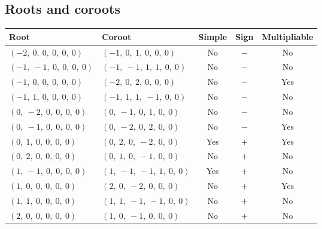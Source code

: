 \documentclass[11pt]{article}
\theoremstyle{definition}
\begin{document}
\subsection{Roots and coroots}
\begin{center}
\begin{tabular}{|l|l|c|c|c|}
    \hline
    \textbf{Root} & \textbf{Coroot} & \textbf{Simple} & \textbf{Sign} & \textbf{Multipliable} \\
    \hline
    $\left( -2, \  0, \  0, \  0, \  0, \  0\right)$ & $\left( -1, \  0, \  1, \  0, \  0, \  0\right)$ & No & $-$ & No \\
    \hline
    $\left( -1, \  -1, \  0, \  0, \  0, \  0\right)$ & $\left( -1, \  -1, \  1, \  1, \  0, \  0\right)$ & No & $-$ & No \\
    \hline
    $\left( -1, \  0, \  0, \  0, \  0, \  0\right)$ & $\left( -2, \  0, \  2, \  0, \  0, \  0\right)$ & No & $-$ & Yes \\
    \hline
    $\left( -1, \  1, \  0, \  0, \  0, \  0\right)$ & $\left( -1, \  1, \  1, \  -1, \  0, \  0\right)$ & No & $-$ & No \\
    \hline
    $\left( 0, \  -2, \  0, \  0, \  0, \  0\right)$ & $\left( 0, \  -1, \  0, \  1, \  0, \  0\right)$ & No & $-$ & No \\
    \hline
    $\left( 0, \  -1, \  0, \  0, \  0, \  0\right)$ & $\left( 0, \  -2, \  0, \  2, \  0, \  0\right)$ & No & $-$ & Yes \\
    \hline
    $\left( 0, \  1, \  0, \  0, \  0, \  0\right)$ & $\left( 0, \  2, \  0, \  -2, \  0, \  0\right)$ & Yes & $+$ & Yes \\
    \hline
    $\left( 0, \  2, \  0, \  0, \  0, \  0\right)$ & $\left( 0, \  1, \  0, \  -1, \  0, \  0\right)$ & No & $+$ & No \\
    \hline
    $\left( 1, \  -1, \  0, \  0, \  0, \  0\right)$ & $\left( 1, \  -1, \  -1, \  1, \  0, \  0\right)$ & Yes & $+$ & No \\
    \hline
    $\left( 1, \  0, \  0, \  0, \  0, \  0\right)$ & $\left( 2, \  0, \  -2, \  0, \  0, \  0\right)$ & No & $+$ & Yes \\
    \hline
    $\left( 1, \  1, \  0, \  0, \  0, \  0\right)$ & $\left( 1, \  1, \  -1, \  -1, \  0, \  0\right)$ & No & $+$ & No \\
    \hline
    $\left( 2, \  0, \  0, \  0, \  0, \  0\right)$ & $\left( 1, \  0, \  -1, \  0, \  0, \  0\right)$ & No & $+$ & No \\
    \hline
\end{tabular}
\end{center}
\end{document}
